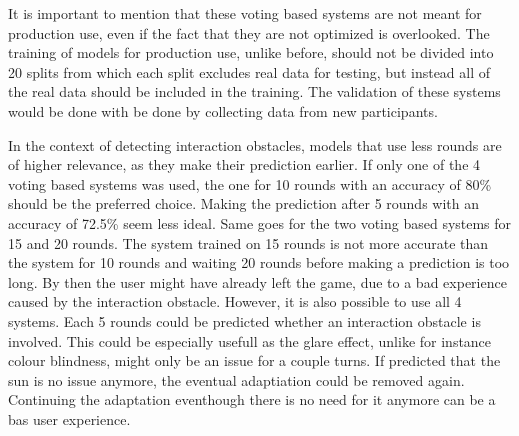 It is important to mention that these voting based systems are not meant for production use, even if the fact that they are not optimized is overlooked. The training of models for production use, unlike before, should not be divided into 20 splits from which each split excludes real data for testing, but instead all of the real data should be included in the training. The validation of these systems would be done with be done by collecting data from new participants. 

In the context of detecting interaction obstacles, models that use less rounds are of higher relevance, as they make their prediction earlier. If only one of the 4 voting based systems was used, the one for 10 rounds with an accuracy of 80\% should be the preferred choice. Making the prediction after 5 rounds with an accuracy of 72.5\% seem less ideal. Same goes for the two voting based systems for 15 and 20 rounds. The system trained on 15 rounds is not more accurate than the system for 10 rounds and waiting 20 rounds before making a prediction is too long. By then the user might have already left the game, due to a bad experience caused by the interaction obstacle. However, it is also possible to use all 4 systems. Each 5 rounds could be predicted whether an interaction obstacle is involved. This could be especially usefull as the glare effect, unlike for instance colour blindness,  might only be an issue for a couple turns. If predicted that the sun is no issue anymore, the eventual adaptiation could be removed again. Continuing the adaptation eventhough there is no need for it anymore can be a bas user experience.

